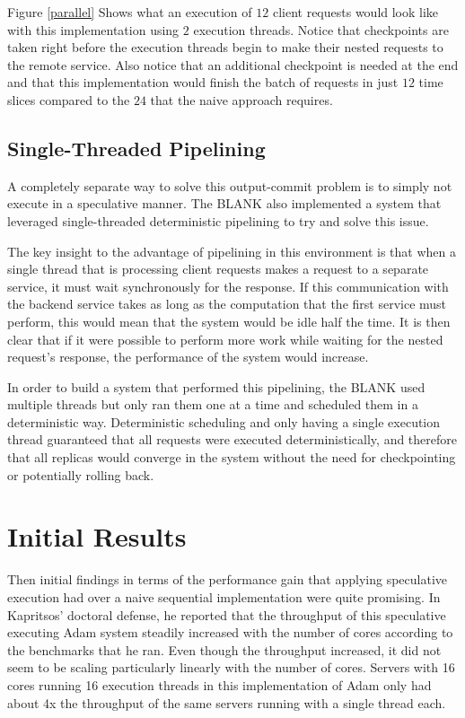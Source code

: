 \documentclass[11pt, oneside]{report}
\begin{document}
Figure \ref{parallel} Shows what an execution of $12$ client requests would look like with this implementation using $2$ execution threads. 
Notice that checkpoints are taken right before the execution threads begin to make their nested requests to the remote service. Also notice that an additional checkpoint is needed at the end and that this implementation would finish the batch of requests in just $12$ time slices compared to the $24$ that the naive approach requires.

\subsection{Single-Threaded Pipelining}\label{STP}

A completely separate way to solve this output-commit problem is to simply not execute in a speculative manner. 
The
BLANK %
also implemented a system that leveraged single-threaded deterministic pipelining to try and solve this issue.

The key insight to the advantage of pipelining in this environment is that when a single thread that is processing client requests makes a request to a separate service, it must wait synchronously for the response. 
If this communication with the backend service takes as long as the computation that the first service must perform, this would mean that the system would be idle half the time. 
It is then clear that if it were possible to perform more work while waiting for the nested request's response, the performance of the system would increase.

In order to build a system that performed this pipelining, the BLANK used multiple threads but only ran them one at a time and scheduled them in a deterministic way. 
Deterministic scheduling and only having a single execution thread guaranteed that all requests were executed deterministically, and therefore that all replicas would converge in the system without the need for checkpointing or potentially rolling back. 


\section{Initial Results}

Then initial findings in terms of the performance gain that applying speculative execution had over a naive sequential implementation were quite promising. 
In Kapritsos' doctoral defense, he reported that the throughput of this speculative executing Adam system steadily increased with the number of cores according to the benchmarks that he ran. 
Even though the throughput increased, it did not seem to be scaling particularly linearly with the number of cores. 
Servers with 16 cores running 16 execution threads in this implementation of Adam only had about 4x the throughput of the same servers running with a single thread each.
\end{document}
